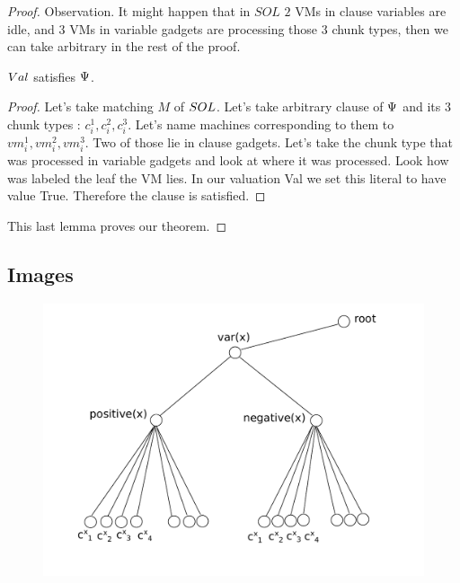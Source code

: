 \begin{proof}
Observation. It might happen that in $SOL$ $2$ VMs in
clause variables are idle, and $3$ VMs in variable gadgets are
processing those $3$ chunk types, then we can take arbitrary in the rest
of the proof.


\begin{lemma}$Val$ satisfies $\Psi$.
\end{lemma}
\begin{proof}
Let's take matching $M$ of $SOL$. Let's take arbitrary clause of
$\Psi$ and its $3$ chunk types
: $c_i^1, c_i^2, c_i^3$. Let's name machines corresponding to them
to $vm_i^1, vm_i^2, vm_i^3$. Two of those lie in clause gadgets. Let's
take the chunk type that was processed in variable
gadgets and look at where it was processed. Look how was labeled the
leaf the VM lies. In our valuation Val we set this literal to have
value True. Therefore the clause is satisfied.
\end{proof}

This last lemma proves our theorem.
\end{proof}
\subsection{Images}

\begin{figure}[htbp]
\includegraphics[width = \columnwidth]{figs/gadget-no-bw}
\end{figure}



